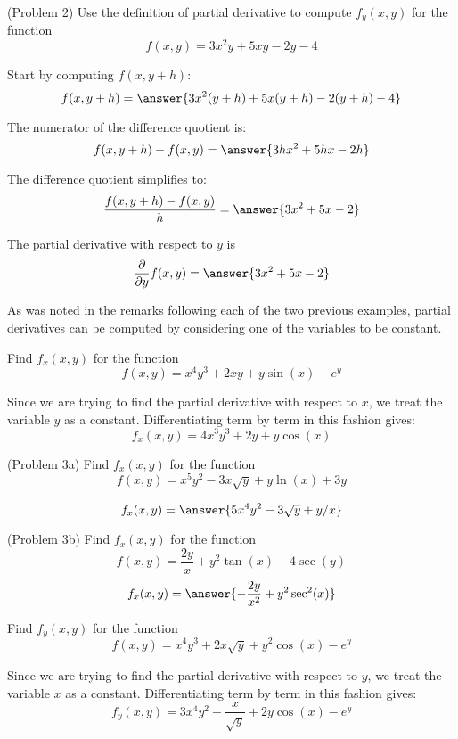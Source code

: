 \documentclass[handout]{ximera}
\begin{document}
\begin{problem}(Problem 2)
Use the definition of partial derivative to compute $f_y(x,y)$ for the function
\[
f(x,y) = 3x^2y + 5xy - 2y - 4
\]

Start by computing $f(x, y+h)$:
\[
f(x, y+h) = \answer{3x^2(y+h) + 5x(y+h) - 2(y+h) - 4}
\]

The numerator of the difference quotient is:
\[
f(x,y+h) - f(x,y) = \answer{3hx^2 + 5hx - 2h}
\]

The difference quotient simplifies to:
\[
\frac{f(x,y+h) - f(x,y)}{h} = \answer{3x^2 + 5x -2}
\]

The partial derivative with respect to $y$ is
\[
\frac{\partial}{\partial y} f(x,y) = \answer{3x^2 + 5x -2}
\]
\end{problem}

As was noted in the remarks following each of the two previous examples, partial derivatives can be computed by considering one of the variables to be constant.

\begin{example}[Example 3]
Find $f_x(x,y)$ for the function 
\[
f(x,y) = x^4y^3 + 2xy + y\sin(x) - e^y
\]

Since we are trying to find the partial derivative with respect to $x$, we treat the variable $y$ as a constant.
Differentiating term by term in this fashion gives:
\[
f_x(x,y) = 4x^3y^3 + 2y + y\cos(x)
\]
\end{example}

\begin{problem}(Problem 3a)
Find $f_x(x,y)$ for the function 
\[
f(x,y) = x^5y^2 - 3x\sqrt y + y\ln(x) + 3y
\]

\[
f_x(x,y) = \answer{5x^4y^2 - 3\sqrt y + y/x}
\]
\end{problem}

\begin{problem}(Problem 3b)
Find $f_x(x,y)$ for the function 
\[
f(x,y) = \frac{2y}{x} + y^2\tan(x) + 4\sec(y)
\]
\[
f_x(x,y) = \answer{-\frac{2y}{x^2} + y^2\sec^2(x)}
\]
\end{problem}


\begin{example}[Example 4]
Find $f_y(x,y)$ for the function 
\[
f(x,y) = x^4y^3 + 2x\sqrt{y} + y^2\cos(x) - e^y
\]

Since we are trying to find the partial derivative with respect to $y$, we treat the variable $x$ as a constant.
Differentiating term by term in this fashion gives:
\[
f_y(x,y) = 3x^4y^2 + \frac{x}{\sqrt{y}} + 2y\cos(x) - e^y
\]
\end{example}
\end{document}
